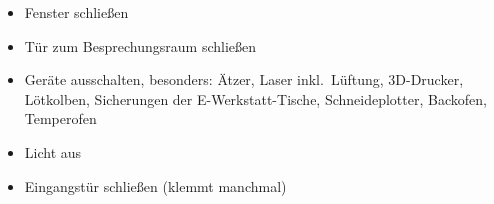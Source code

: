 \documentclass[a4paper,landscape]{scrartcl}
\begin{document}
\Schild
{}

\begin{Spalte}[0.78\linewidth]
\begin{itemize}
  \item Fenster schließen
  \item Tür zum Besprechungsraum schließen
  \item Geräte ausschalten, besonders: Ätzer, Laser inkl.\ Lüftung, 3D-Drucker, Lötkolben,
        Sicherungen der E-Werkstatt-Tische, Schneideplotter, Backofen, Temperofen
  \item Licht aus
  \item Eingangstür schließen (klemmt manchmal)
\end{itemize}
\end{Spalte}
\end{document}
